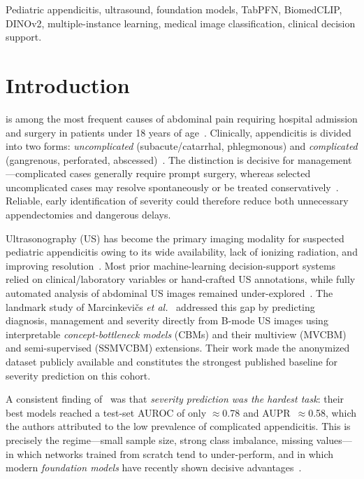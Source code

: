 \documentclass[journal]{IEEEtran}
\begin{document}
\begin{IEEEkeywords}
Pediatric appendicitis, ultrasound, foundation models, TabPFN, BiomedCLIP, DINOv2,
multiple-instance learning, medical image classification, clinical decision support.
\end{IEEEkeywords}

\section{Introduction}
 is among the most frequent causes of abdominal pain
requiring hospital admission and surgery in patients under 18 years of
age~\cite{addiss1990epidemiology,andersson2007natural}. Clinically, appendicitis is
divided into two forms: \emph{uncomplicated} (subacute/catarrhal, phlegmonous) and
\emph{complicated} (gangrenous, perforated, abscessed)~\cite{andersson2007natural,
bhangu2015acute}. The distinction is decisive for management---complicated cases
generally require prompt surgery, whereas selected uncomplicated cases may resolve
spontaneously or be treated conservatively~\cite{bhangu2015acute,gorter2016diagnosis}.
Reliable, early identification of severity could therefore reduce both unnecessary
appendectomies and dangerous delays.

Ultrasonography (US) has become the primary imaging modality for suspected pediatric
appendicitis owing to its wide availability, lack of ionizing radiation, and
improving resolution~\cite{mittal2013performance}. Most prior machine-learning
decision-support systems relied on clinical/laboratory variables or hand-crafted US
annotations, while fully automated analysis of abdominal US images remained
under-explored~\cite{marcinkevics2024interpretable}. The landmark study of
Marcinkevi\v{c}s \emph{et al.}~\cite{marcinkevics2024interpretable} addressed this
gap by predicting diagnosis, management and severity directly from B-mode US images
using interpretable \emph{concept-bottleneck models} (CBMs) and their multiview
(MVCBM) and semi-supervised (SSMVCBM) extensions. Their work made the anonymized
dataset publicly available and constitutes the strongest published baseline for
severity prediction on this cohort.

A consistent finding of~\cite{marcinkevics2024interpretable} was that \emph{severity
prediction was the hardest task}: their best models reached a test-set AUROC of only
$\approx$0.78 and AUPR~$\approx$0.58, which the authors attributed to the low
prevalence of complicated appendicitis. This is precisely the regime---small sample
size, strong class imbalance, missing values---in which networks trained from scratch
tend to under-perform, and in which modern \emph{foundation models} have recently
shown decisive advantages~\cite{hollmann2025accurate,hollmann2023tabpfn,
zhang2025biomedclip,oquab2024dinov2}.
\end{document}
